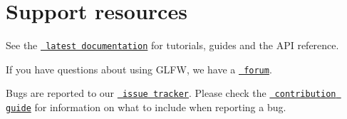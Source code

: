 \chapter{Support resources}
\hypertarget{md_runtime_2glfw_2docs_2_s_u_p_p_o_r_t}{}\label{md_runtime_2glfw_2docs_2_s_u_p_p_o_r_t}
\label{md_runtime_2glfw_2docs_2_s_u_p_p_o_r_t_autotoc_md102}%
%


See the \href{https://www.glfw.org/docs/latest/}{\texttt{ latest documentation}} for tutorials, guides and the API reference.

If you have questions about using GLFW, we have a \href{https://discourse.glfw.org/}{\texttt{ forum}}.

Bugs are reported to our \href{https://github.com/glfw/glfw/issues}{\texttt{ issue tracker}}. Please check the \href{https://github.com/glfw/glfw/blob/master/docs/CONTRIBUTING.md}{\texttt{ contribution guide}} for information on what to include when reporting a bug. 